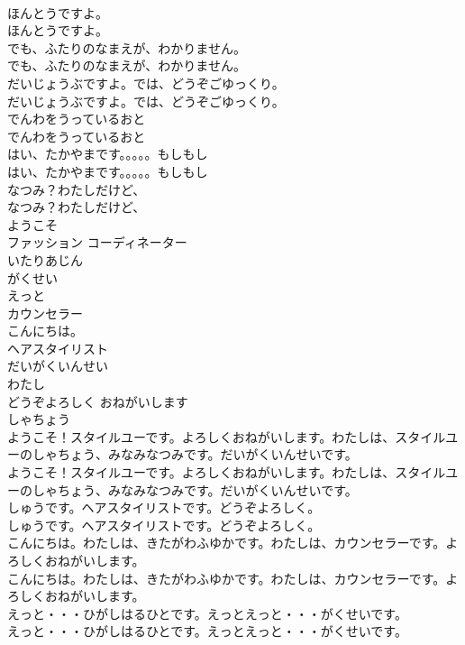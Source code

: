 \documentclass[8pt]{extreport}
\begin{document}
\begin{CJK}{UTF8}{min}
\\	ほんとうですよ。	
\\	ほんとうですよ。 
\\	でも、ふたりのなまえが、わかりません。	
\\	でも、ふたりのなまえが、わかりません。 
\\	だいじょうぶですよ。では、どうぞごゆっくり。	
\\	だいじょうぶですよ。では、どうぞごゆっくり。 
\\	でんわをうっているおと	
\\	でんわをうっているおと 
\\	はい、たかやまです。。。。。もしもし	
\\	はい、たかやまです。。。。。もしもし 
\\	なつみ？わたしだけど、	
\\	なつみ？わたしだけど、 
\\	ようこそ
\\	ファッション コーディネーター
\\	いたりあじん
\\	がくせい
\\	えっと
\\	カウンセラー
\\	こんにちは。
\\	ヘアスタイリスト
\\	だいがくいんせい
\\	わたし
\\	どうぞよろしく おねがいします
\\	しゃちょう
\\	ようこそ！スタイルユーです。よろしくおねがいします。わたしは、スタイルユーのしゃちょう、みなみなつみです。だいがくいんせいです。	
\\	ようこそ！スタイルユーです。よろしくおねがいします。わたしは、スタイルユーのしゃちょう、みなみなつみです。だいがくいんせいです。 
\\	しゅうです。ヘアスタイリストです。どうぞよろしく。	
\\	しゅうです。ヘアスタイリストです。どうぞよろしく。 
\\	こんにちは。わたしは、きたがわふゆかです。わたしは、カウンセラーです。よろしくおねがいします。	
\\	こんにちは。わたしは、きたがわふゆかです。わたしは、カウンセラーです。よろしくおねがいします。 
\\	えっと・・・ひがしはるひとです。えっとえっと・・・がくせいです。	
\\	えっと・・・ひがしはるひとです。えっとえっと・・・がくせいです。 

\end{CJK}
\end{document}
